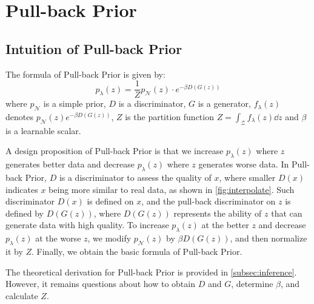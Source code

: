 
\section{Pull-back Prior}\label{sec:pull_back_prior}

\subsection{Intuition of Pull-back Prior}\label{subsec:intuition}

The formula of Pull-back Prior is given by:
\begin{equation}\label{eq:pull_back_prior}
	p_\lambda(z) = \frac{1}{Z} p_\mathcal{N}(z) \cdot e^{- \beta D(G(z))} \tag{4}
\end{equation}
where $p_\mathcal{N}$ is a simple prior, $D$ is a discriminator, $G$ is a generator, $f_\lambda(z)$ denotes $p_\mathcal{N}(z) e^{- \beta D(G(z))}$, $Z$ is the partition function $Z = \int_{\mathcal{Z}} f_\lambda(z) \dd z$ and $\beta$ is a learnable scalar.

A design proposition of Pull-back Prior is that we increase $p_\lambda(z)$ where $z$ generates better data and decrease $p_\lambda(z)$ where $z$ generates worse data. In Pull-back Prior, 
$D$ is a discriminator to assess the quality of $x$, where smaller $D(x)$ indicates $x$ being more similar to real data, as shown in \cref{fig:interpolate}. Such discriminator $D(x)$ is defined on $x$, and the pull-back discriminator on $z$ is defined by $D(G(z))$, where $D(G(z))$ represents the ability of $z$ that can generate data with high quality. To increase $p_\lambda(z)$ at the better $z$ and decrease $p_\lambda(z)$ at the worse $z$, we modify $p_\mathcal{N}(z)$ by $\beta D(G(z))$, and then normalize it by $Z$. Finally, we obtain the basic formula of Pull-back Prior. 

The theoretical derivation for Pull-back Prior is provided in \cref{subsec:inference}. However, it remains questions about how to obtain $D$ and $G$, determine $\beta$, and calculate $Z$. 

